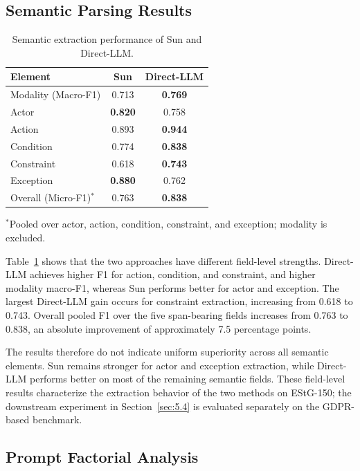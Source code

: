 \documentclass[conference]{IEEEtran}
\begin{document}
\subsection{Semantic Parsing Results}
\label{sec:5.2}

\begin{table}[t]
\centering
\caption{Semantic extraction performance of Sun and Direct-LLM.}
\label{tab:semantic_results}
\begin{tabular}{lcc}
\toprule
\textbf{Element} & \textbf{Sun} & \textbf{Direct-LLM} \\
\midrule
Modality (Macro-F1) & 0.713 & \textbf{0.769} \\
Actor                & \textbf{0.820} & 0.758 \\
Action               & 0.893 & \textbf{0.944} \\
Condition            & 0.774 & \textbf{0.838} \\
Constraint           & 0.618 & \textbf{0.743} \\
Exception            & \textbf{0.880} & 0.762 \\
\midrule
Overall (Micro-F1)$^{*}$ & 0.763 & \textbf{0.838} \\
\bottomrule
\end{tabular}

\vspace{1mm}
\footnotesize{$^{*}$Pooled over actor, action, condition, constraint, and exception; modality is excluded.}
\end{table}

Table~\ref{tab:semantic_results} shows that the two approaches have different field-level strengths. Direct-LLM achieves higher F1 for action, condition, and constraint, and higher modality macro-F1, whereas Sun performs better for actor and exception. The largest Direct-LLM gain occurs for constraint extraction, increasing from 0.618 to 0.743. Overall pooled F1 over the five span-bearing fields increases from 0.763 to 0.838, an absolute improvement of approximately 7.5 percentage points.

The results therefore do not indicate uniform superiority across all semantic elements. Sun remains stronger for actor and exception extraction, while Direct-LLM performs better on most of the remaining semantic fields. These field-level results characterize the extraction behavior of the two methods on EStG-150; the downstream experiment in Section~\ref{sec:5.4} is evaluated separately on the GDPR-based benchmark.

\subsection{Prompt Factorial Analysis}
\label{sec:5.3}
\end{document}
